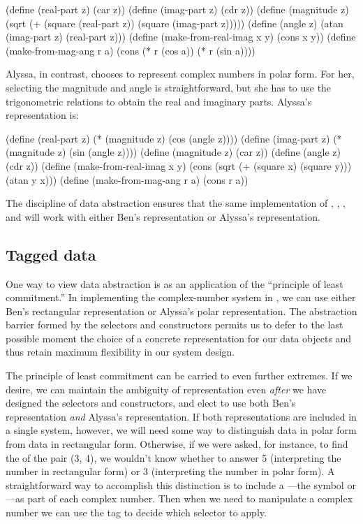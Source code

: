 \begin{codeBlock}
(define (real-part z) (car z))
(define (imag-part z) (cdr z))
(define (magnitude z)
  (sqrt (+ (square (real-part z))
           (square (imag-part z)))))
(define (angle z)
  (atan (imag-part z) (real-part z)))
(define (make-from-real-imag x y) (cons x y))
(define (make-from-mag-ang r a)
  (cons (* r (cos a)) (* r (sin a))))
\end{codeBlock}

\noindent
Alyssa, in contrast, chooses to represent complex numbers in polar form.  For
her, selecting the magnitude and angle is straightforward, but she has to use
the trigonometric relations to obtain the real and imaginary parts.  Alyssa's
representation is:

\begin{codeBlock}
(define (real-part z) (* (magnitude z)
                         (cos (angle z))))
(define (imag-part z) (* (magnitude z)
                         (sin (angle z))))
(define (magnitude z) (car z))
(define (angle z) (cdr z))
(define (make-from-real-imag x y)
  (cons (sqrt (+ (square x) (square y)))
        (atan y x)))
(define (make-from-mag-ang r a) (cons r a))
\end{codeBlock}

\noindent
The discipline of data abstraction ensures that the same implementation of
, , , and
 will work with either Ben's representation or Alyssa's
representation.

\subsection{Tagged data}
\label{Section 2.4.2}

One way to view data abstraction is as an application of the ``principle of
least commitment.''  In implementing the complex-number system in
, we can use either Ben's rectangular representation or Alyssa's
polar representation.  The abstraction barrier formed by the selectors and
constructors permits us to defer to the last possible moment the choice of a
concrete representation for our data objects and thus retain maximum
flexibility in our system design.

The principle of least commitment can be carried to even further extremes.  If
we desire, we can maintain the ambiguity of representation even \emph{after} we
have designed the selectors and constructors, and elect to use both Ben's
representation \emph{and} Alyssa's representation.  If both representations are
included in a single system, however, we will need some way to distinguish data
in polar form from data in rectangular form.  Otherwise, if we were asked, for
instance, to find the  of the pair (3, 4), we wouldn't know
whether to answer 5 (interpreting the number in rectangular form) or 3
(interpreting the number in polar form).  A straightforward way to accomplish
this distinction is to include a ---the symbol
 or ---as part of each complex number.  Then
when we need to manipulate a complex number we can use the tag to decide which
selector to apply.

